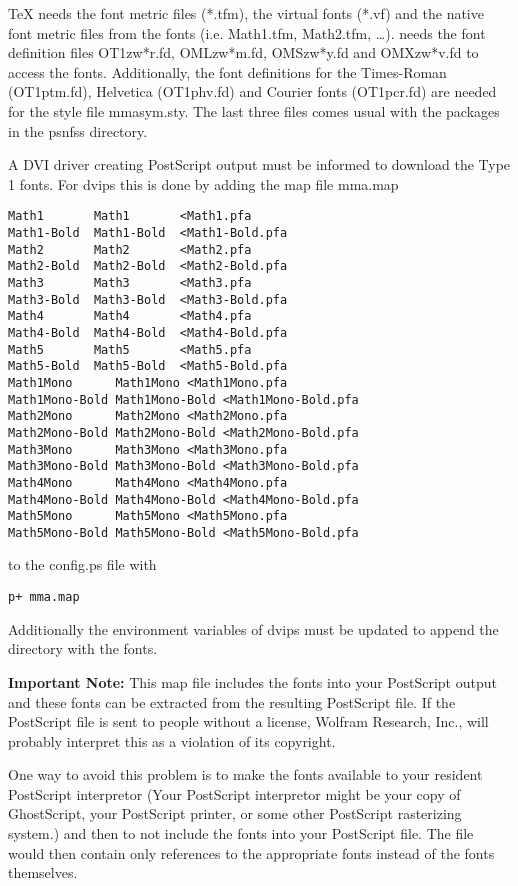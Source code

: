 \documentclass{article}
\begin{document}
\begin{sloppypar}
\TeX{} needs the font metric files (\textsf{*.tfm}),
the virtual fonts (\textsf{*.vf}) and the native 
font metric files from the \MathLogo{} fonts (i{.}e{.} 
\textsf{Math1.tfm}, \textsf{Math2.tfm}, \ldots).
\LaTeXe{} needs the font definition files 
\textsf{OT1zw*r.fd}, \textsf{OMLzw*m.fd}, \textsf{OMSzw*y.fd} and
\textsf{OMXzw*v.fd} to access the fonts. Additionally, the 
font definitions for the Times-Roman (\textsf{OT1ptm.fd}), Helvetica
(\textsf{OT1phv.fd}) and Courier fonts (\textsf{OT1pcr.fd})  are needed
for the style file \textsf{mmasym.sty}.	The last three files comes usual
with the \LaTeXe{} packages in the \textsf{psnfss} directory.
\end{sloppypar}
A DVI driver creating PostScript output must be informed 
to download the Type 1 \MathLogo{} fonts. For \textsf{dvips} this is done by
adding the map file \textsf{mma.map}
%
\begin{verbatim}
Math1       Math1       <Math1.pfa
Math1-Bold  Math1-Bold  <Math1-Bold.pfa
Math2       Math2       <Math2.pfa
Math2-Bold  Math2-Bold  <Math2-Bold.pfa
Math3       Math3       <Math3.pfa
Math3-Bold  Math3-Bold  <Math3-Bold.pfa
Math4       Math4       <Math4.pfa
Math4-Bold  Math4-Bold  <Math4-Bold.pfa
Math5       Math5       <Math5.pfa
Math5-Bold  Math5-Bold  <Math5-Bold.pfa
Math1Mono      Math1Mono <Math1Mono.pfa
Math1Mono-Bold Math1Mono-Bold <Math1Mono-Bold.pfa
Math2Mono      Math2Mono <Math2Mono.pfa
Math2Mono-Bold Math2Mono-Bold <Math2Mono-Bold.pfa
Math3Mono      Math3Mono <Math3Mono.pfa
Math3Mono-Bold Math3Mono-Bold <Math3Mono-Bold.pfa
Math4Mono      Math4Mono <Math4Mono.pfa
Math4Mono-Bold Math4Mono-Bold <Math4Mono-Bold.pfa
Math5Mono      Math5Mono <Math5Mono.pfa
Math5Mono-Bold Math5Mono-Bold <Math5Mono-Bold.pfa
\end{verbatim}
%
to the \textsf{config.ps} file with
\begin{verbatim}
p+ mma.map
\end{verbatim}
Additionally the environment variables of \textsf{dvips} must be updated to
append the directory with the fonts.


\textbf{Important Note:} 
This map file includes the \MathLogo{} fonts into your PostScript output and
these fonts can be extracted from the resulting PostScript file. 
If the PostScript file is
sent to people without a \MathLogo{} license, Wolfram Research, Inc., will
probably interpret this as a violation of its copyright.

One way to avoid this problem is to make the fonts available to 
your resident PostScript interpretor 
(Your PostScript interpretor might be your copy of GhostScript,
your PostScript printer, or some other PostScript rasterizing system.)
and then to not include the 
fonts into your PostScript file.  
The file would then contain only
references to the appropriate \MathLogo{} fonts instead of 
the fonts themselves.
\end{document}
